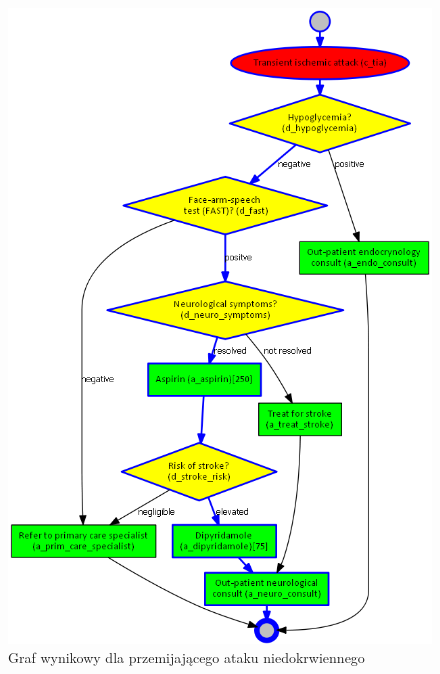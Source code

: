 \begin{figure}[H]
\centering
\includegraphics[scale=0.5]{img/rozwiazanie1tia.png}
\caption{Graf wynikowy dla przemijającego ataku niedokrwiennego}
\label{fig:rozw_tia}
\end{figure}
